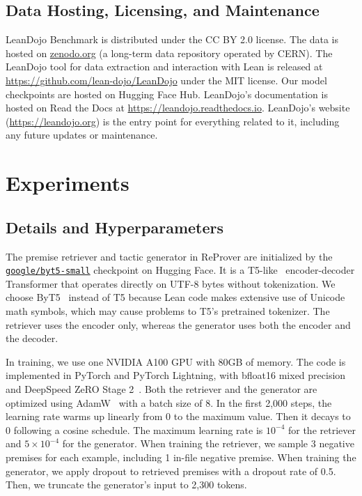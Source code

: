 \documentclass{article}
\newcommand{\weburl}{\url{https://leandojo.org}}
\newcommand\name{ReProver}
\begin{document}
\subsection{Data Hosting, Licensing, and Maintenance}
\label{appendix:hosting}

LeanDojo Benchmark is distributed under the CC BY 2.0 license. The data is hosted on \href{https://zenodo.org/}{zenodo.org} (a long-term data repository operated by CERN). The LeanDojo tool for data extraction and interaction with Lean is released at \url{https://github.com/lean-dojo/LeanDojo} 
under the MIT license. Our model checkpoints are hosted on Hugging Face Hub. LeanDojo's documentation is hosted on Read the Docs at \url{https://leandojo.readthedocs.io}. LeanDojo's website ({\weburl}) is the entry point for everything related to it, including any future updates or maintenance. 



\section{Experiments}

\subsection{Details and Hyperparameters}
\label{appendix:experimentaldetails}

The premise retriever and tactic generator in {\name} are initialized by the \href{https://huggingface.co/google/byt5-small}{\texttt{google/byt5-small}} checkpoint on Hugging Face. It is a T5-like~\cite{raffel2020exploring} encoder-decoder Transformer that operates directly on UTF-8 bytes without tokenization. We choose ByT5~\cite{xue2022byt5} instead of T5 because Lean code makes extensive use of Unicode math symbols, which may cause problems to T5's pretrained tokenizer. The retriever uses the encoder only, whereas the generator uses both the encoder and the decoder. 

In training, we use one NVIDIA A100 GPU with 80GB of memory. The code is implemented in PyTorch and PyTorch Lightning, with bfloat16 mixed precision and DeepSpeed ZeRO Stage 2~\cite{rasley2020deepspeed}. Both the retriever and the generator are optimized using AdamW~\cite{loshchilovdecoupled} with a batch size of 8. In the first 2,000 steps, the learning rate warms up linearly from 0 to the maximum value. Then it decays to 0 following a cosine schedule. The maximum learning rate is $10^{-4}$ for the retriever and $5 \times 10^{-4}$ for the generator. When training the retriever, we sample 3 negative premises for each example, including 1 in-file negative premise. When training the generator, we apply dropout to retrieved premises with a dropout rate of 0.5. Then, we truncate the generator's input to 2,300 tokens.
\end{document}
